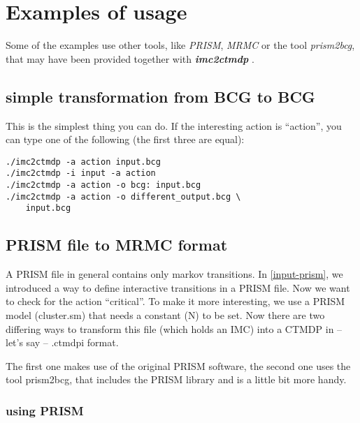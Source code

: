 \documentclass[a4paper,11pt]{scrartcl}
\newcommand{\imcToCtmdp}{\textbf{\textit{imc2ctmdp}} }
\begin{document}
\section{Examples of usage}

Some of the examples use other tools, like \emph{PRISM}\cite{prism-page},
\emph{MRMC}\cite{mrmc-page} or the tool \emph{prism2bcg}, that may have been
provided together with \imcToCtmdp.

\subsection{simple transformation from BCG to BCG}

This is the simplest thing you can do. If the interesting action is ``action'',
you can type one of the following (the first three are equal):
\begin{verbatim}
./imc2ctmdp -a action input.bcg
./imc2ctmdp -i input -a action
./imc2ctmdp -a action -o bcg: input.bcg
./imc2ctmdp -a action -o different_output.bcg \
    input.bcg
\end{verbatim}

\subsection{PRISM file to MRMC format}

A PRISM file in general contains only markov transitions.
In \ref{input-prism}, we introduced a way to define interactive transitions
in a PRISM file. Now we want to check for the action ``critical''.
To make it more interesting, we use a PRISM model (cluster.sm) that needs a
constant (N) to be set.
Now there are two differing ways to transform this file (which holds an IMC)
into a CTMDP in -- let's say -- .ctmdpi format.

The first one makes use of the original PRISM software, the second one uses
the tool prism2bcg, that includes the PRISM library and is a little bit more
handy.

\subsubsection{using PRISM}
\end{document}
